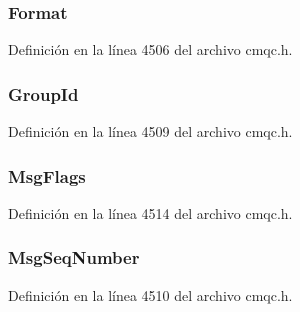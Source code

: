 \subsubsection[{Format}]{ Format}\label{structtag_m_q_m_d_e_a435a478822008713f8aaff89f369ed63}


Definición en la línea 4506 del archivo cmqc.\+h.

\hypertarget{structtag_m_q_m_d_e_abcf7ab1abd1c768c0adb9acb3d09c6f1}{}
\subsubsection[{Group\+Id}]{ Group\+Id}\label{structtag_m_q_m_d_e_abcf7ab1abd1c768c0adb9acb3d09c6f1}


Definición en la línea 4509 del archivo cmqc.\+h.

\hypertarget{structtag_m_q_m_d_e_a10cb94bb1b2528f6ad936454455bb40a}{}
\subsubsection[{Msg\+Flags}]{ Msg\+Flags}\label{structtag_m_q_m_d_e_a10cb94bb1b2528f6ad936454455bb40a}


Definición en la línea 4514 del archivo cmqc.\+h.

\hypertarget{structtag_m_q_m_d_e_a7c78a4f7c1bbda9f124f904e0d02a7a2}{}
\subsubsection[{Msg\+Seq\+Number}]{ Msg\+Seq\+Number}\label{structtag_m_q_m_d_e_a7c78a4f7c1bbda9f124f904e0d02a7a2}


Definición en la línea 4510 del archivo cmqc.\+h.

\hypertarget{structtag_m_q_m_d_e_aac8433c970f16a602e3b79400e87d28b}{}
